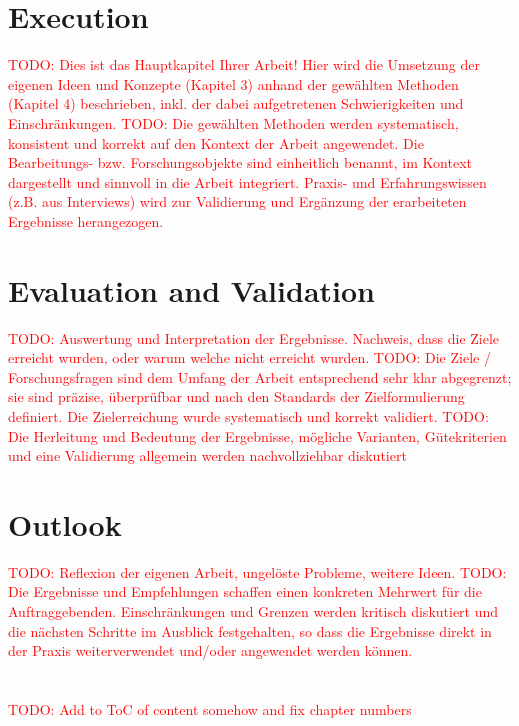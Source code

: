 \documentclass[a4paper,10.5pt,
			   bindingoffset=0.2in,left=3.35cm,right=2.12cm,top=3.75cm,bottom=2.88cm,%
				footskip=.25in
				listof=numbered,toc=chapterentrywithdots]{scrreport}
\renewcommand{\todo}[1]{\textcolor{red}{TODO: #1}}
\begin{document}
	\chapter{Execution}
		\todo{Dies ist das Hauptkapitel Ihrer Arbeit! Hier wird die Umsetzung der eigenen Ideen und Konzepte (Kapitel 3) anhand der gewählten Methoden (Kapitel 4) beschrieben, inkl. der dabei aufgetretenen Schwierigkeiten und Einschränkungen.}
		\todo{Die gewählten Methoden werden systematisch, konsistent und korrekt auf den Kontext der Arbeit angewendet. Die Bearbeitungs- bzw. Forschungsobjekte sind einheitlich benannt, im Kontext dargestellt und sinnvoll in die Arbeit integriert. Praxis- und Erfahrungswissen (z.B. aus Interviews) wird zur Validierung und Ergänzung der erarbeiteten Ergebnisse herangezogen. }
	
	\chapter{Evaluation and Validation}
		\todo{Auswertung und Interpretation der Ergebnisse. Nachweis, dass die Ziele erreicht wurden, oder warum	welche nicht erreicht wurden.}
		\todo{Die Ziele / Forschungsfragen sind dem Umfang der Arbeit entsprechend sehr klar abgegrenzt; sie sind präzise, überprüfbar und nach den Standards der Zielformulierung definiert. Die Zielerreichung wurde systematisch und korrekt validiert.}
		\todo{Die Herleitung und Bedeutung der Ergebnisse, mögliche Varianten, Gütekriterien und eine Validierung allgemein werden nachvollziehbar diskutiert}
	
	\chapter{Outlook}
		\todo{Reflexion der eigenen Arbeit, ungelöste Probleme, weitere Ideen.}
		\todo{Die Ergebnisse und Empfehlungen schaffen einen konkreten Mehrwert für die Auftraggebenden. Einschränkungen und Grenzen werden kritisch diskutiert und die nächsten Schritte im Ausblick festgehalten, so dass die Ergebnisse direkt in der Praxis weiterverwendet und/oder angewendet werden können.}
	
	\chapter{\glossaryname}
	\printglossary[title={}]


	\todo{Add to ToC of content somehow and fix chapter numbers}
	

	\listoffigures
	
\end{document}
